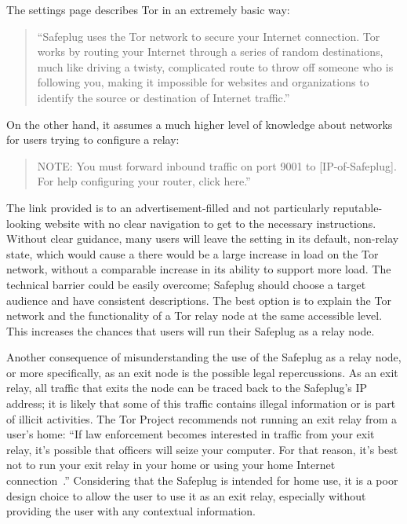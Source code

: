 \documentclass[conference]{IEEEtran}
\begin{document}
The settings page describes Tor in an extremely basic way:

\begin{quotation}
``Safeplug uses the Tor network to secure your Internet connection.  Tor works by routing your Internet through a series of random destinations, much like driving a twisty, complicated route to throw off someone who is following you, making it impossible for websites and organizations to identify the source or destination of Internet traffic.''
\end{quotation}

On the other hand, it assumes a much higher level of knowledge about networks for users trying to configure a relay:
\begin{quotation}
NOTE: You must forward inbound traffic on port 9001 to [IP-of-Safeplug]. \\ For help configuring your router, click here.''
\end{quotation}

The link provided is to an advertisement-filled and not particularly reputable-looking website with no clear navigation to get to the necessary instructions.  Without clear guidance, many users will leave the setting in its default, non-relay state, which would cause a there would be a large increase in load on the Tor network, without a comparable increase in its ability to support more load.  The technical barrier could be easily overcome; Safeplug should choose a target audience and have consistent descriptions.  The best option is to explain the Tor network and the functionality of a Tor relay node at the same accessible level.  This increases the chances that users will run their Safeplug as a relay node.

Another consequence of misunderstanding the use of the Safeplug as a relay node, or more specifically, as an exit node is the possible legal repercussions.  As an exit relay, all traffic that exits the node can be traced back to the Safeplug's IP address; it is likely that some of this traffic contains illegal information or is part of illicit activities.  The Tor Project recommends not running an exit relay from a user's home: ``If law enforcement becomes interested in traffic from your exit relay, it's possible that officers will seize your computer. For that reason, it's best not to run your exit relay in your home or using your home Internet connection~\cite{law}.''  Considering that the Safeplug is intended for home use, it is a poor design choice to allow the user to use it as an exit relay, especially without providing the user with any contextual information.
\end{document}
